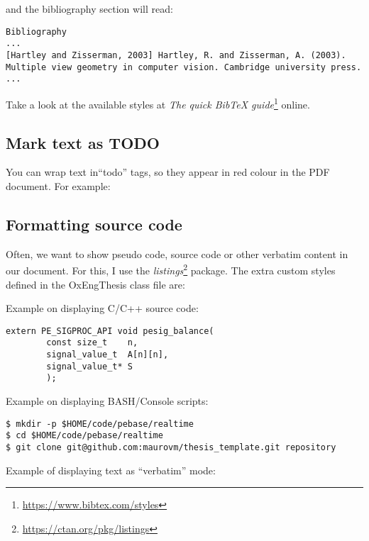 \noindent and the bibliography section will read:


\begin{lstlisting}[style=custom-text]
Bibliography
...
[Hartley and Zisserman, 2003] Hartley, R. and Zisserman, A. (2003). Multiple view geometry in computer vision. Cambridge university press.
...
\end{lstlisting}

Take a look at the available styles at \textit{The quick BibTeX guide}\footnote{\url{https://www.bibtex.com/styles}} online.


\subsection{Mark text as TODO}


You can wrap text in``todo'' tags, so they appear in red colour in the PDF document. For example:



\subsection{Formatting source code}


Often, we want to show pseudo code, source code or other verbatim content in our document. For this, I use the \textit{listings}\footnote{\url{https://ctan.org/pkg/listings}} package. The extra custom styles defined in the OxEngThesis class file are:


Example on displaying C/C++ source code:

\begin{lstlisting}[style=custom-c,caption={Function to balance a matrix.}]
extern PE_SIGPROC_API void pesig_balance(
        const size_t    n,
        signal_value_t  A[n][n],
        signal_value_t* S
        );
\end{lstlisting}

Example on displaying BASH/Console scripts:

\begin{lstlisting}[style=custom-bash,caption={A script in bash.}]
$ mkdir -p $HOME/code/pebase/realtime
$ cd $HOME/code/pebase/realtime
$ git clone git@github.com:maurovm/thesis_template.git repository
\end{lstlisting}

Example of displaying text as ``verbatim'' mode:

